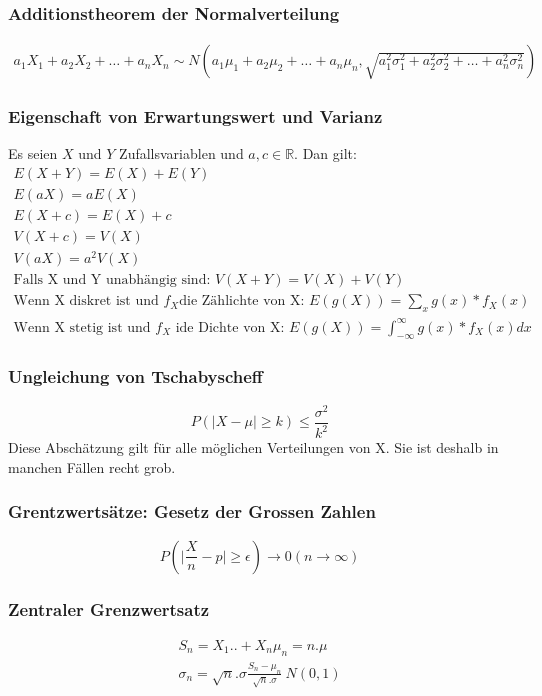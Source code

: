 \documentclass[landscape,twocolumn,a4paper]{article}
\newcommand{\RN}{\mathbb{R}} %
\begin{document}
\subsubsection*{Additionstheorem der Normalverteilung}
\begin{align*}
a_1X_1 + a_2X_2 + \dots + a_nX_n \sim N(a_1\mu_1 + a_2\mu_2 + \dots + a_n\mu_n, \sqrt {a_1^2 \sigma_1^2 + a_2^2 \sigma_2^2 +\dots + a_n^2 \sigma_n^2})
\end{align*}
\subsubsection*{Eigenschaft von Erwartungswert und Varianz}
Es seien $X$ und $Y$  Zufallsvariablen und $a, c \in \RN$.
Dan gilt:
\begin{align*}
E(X + Y) = E(X) + E(Y) \\
E(aX) = aE(X) \\
E(X + c) = E(X) + c\\
V(X + c) = V(X)\\
V(aX) = a^2V(X)\\
\text{Falls X und Y unabhängig sind: } V(X + Y) = V(X) + V(Y) \\
\text{Wenn X diskret ist und } f_X \text{die Zählichte von X: } E(g(X)) = \sum_x g(x) * f_X(x) \\
\text{Wenn X stetig ist und } f_X \text{ ide Dichte von X: } E(g(X)) = \int_{-\infty}^\infty g(x) * f_X(x) dx
\end{align*}

\subsubsection*{Ungleichung von Tschabyscheff}
\begin{equation*}
P(\mid X - \mu \mid \geq k) \leq \frac{\sigma^2}{k^2}
\end{equation*}
Diese Abschätzung gilt für alle möglichen Verteilungen von X. Sie ist deshalb in manchen Fällen recht grob.

\subsubsection*{Grentzwertsätze: Gesetz der Grossen Zahlen}
\begin{equation*}
P(\mid \frac{X}{n} - p \mid \geq \epsilon) \rightarrow 0 (n \rightarrow \infty)
\end{equation*}
\subsubsection*{Zentraler Grenzwertsatz}
\begin{align*}
  S_n = X_1 .. + X_n
  \mu_n = n.\mu \\
  \sigma_n = \sqrt{n}. \sigma
  \frac{S_n - \mu_n}{\sqrt{n}. \sigma} ~N(0,1)
\end{align*}
\end{document}
